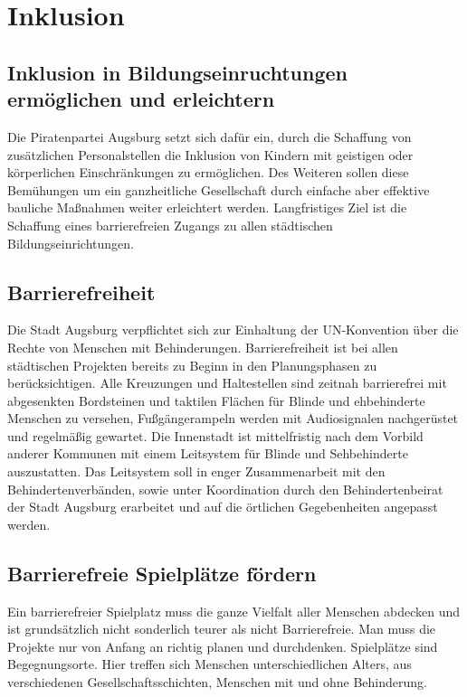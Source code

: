\chapter{Inklusion}

  \section{Inklusion in Bildungseinruchtungen ermöglichen und 
  erleichtern}
  
  Die Piratenpartei Augsburg setzt sich dafür ein, durch die Schaffung von 
  zusätzlichen Personalstellen die Inklusion von Kindern mit geistigen oder 
  körperlichen Einschränkungen zu ermöglichen. Des Weiteren sollen diese 
  Bemühungen um ein ganzheitliche Gesellschaft durch einfache aber effektive 
  bauliche Maßnahmen weiter erleichtert werden. Langfristiges Ziel ist die 
  Schaffung eines barrierefreien Zugangs zu allen städtischen 
  Bildungseinrichtungen.
  
  \section{Barrierefreiheit}
  
  Die Stadt Augsburg verpflichtet sich zur Einhaltung der UN-Konvention über   
  die Rechte von Menschen mit Behinderungen. Barrierefreiheit ist bei allen 
  städtischen Projekten bereits zu Beginn in den Planungsphasen zu 
  berücksichtigen. Alle Kreuzungen und Haltestellen sind zeitnah barrierefrei 
  mit abgesenkten Bordsteinen und taktilen Flächen für Blinde und ehbehinderte 
  Menschen zu versehen, Fußgängerampeln werden mit Audiosignalen nachgerüstet 
  und regelmäßig gewartet. Die Innenstadt ist mittelfristig nach dem Vorbild 
  anderer Kommunen mit einem Leitsystem für Blinde und Sehbehinderte 
  auszustatten. Das Leitsystem soll in enger Zusammenarbeit mit den 
  Behindertenverbänden, sowie unter Koordination durch den Behindertenbeirat 
  der Stadt Augsburg erarbeitet und auf die örtlichen Gegebenheiten angepasst 
  werden.
  
  \section{Barrierefreie Spielplätze fördern}
  
  Ein barrierefreier Spielplatz muss die ganze Vielfalt aller Menschen 
  abdecken und ist grundsätzlich nicht sonderlich teurer als nicht   
  Barrierefreie. Man muss die Projekte nur von Anfang an richtig planen und 
  durchdenken. Spielplätze sind Begegnungsorte. Hier treffen sich Menschen 
  unterschiedlichen Alters, aus verschiedenen Gesellschaftsschichten, Menschen 
  mit und ohne Behinderung.
  
